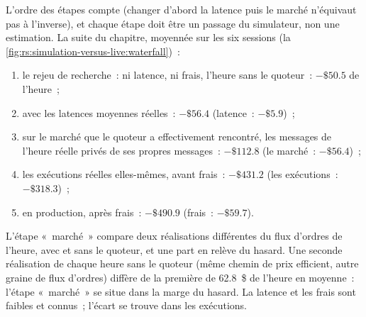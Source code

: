 L'ordre des étapes compte (changer d'abord la latence puis le marché n'équivaut pas à l'inverse), et chaque étape doit être un passage du simulateur, non une
estimation. La suite du chapitre, moyennée sur les six sessions (la \cref{fig:rs:simulation-versus-live:waterfall})~:
\begin{enumerate}
\item le rejeu de recherche~: ni latence, ni frais, l'heure sans le quoteur~: $-\$50.5$ de l'heure~;
\item avec les latences moyennes réelles~: $-\$56.4$ (latence~: $-\$5.9$)~;
\item sur le marché que le quoteur a effectivement rencontré, les messages de l'heure réelle privés de ses propres messages~: $-\$112.8$ (le marché~: $-\$56.4$)~;
\item les exécutions réelles elles-mêmes, avant frais~: $-\$431.2$ (les exécutions~: $-\$318.3$)~;
\item en production, après frais~: $-\$490.9$ (frais~: $-\$59.7$).
\end{enumerate}

L'étape «~marché~» compare deux réalisations différentes du flux d'ordres de l'heure, avec et sans le quoteur, et une part en relève du hasard. Une seconde réalisation de chaque heure
sans le quoteur (même chemin de prix efficient, autre graine de flux d'ordres) diffère de la première de 62.8~\$ de l'heure en moyenne~: l'étape «~marché~» se situe dans la marge du hasard.
La latence et les frais sont faibles et connus~; l'écart se trouve dans les exécutions.

\begin{omfigure}

\label{fig:rs:simulation-versus-live:waterfall}
\end{omfigure}

